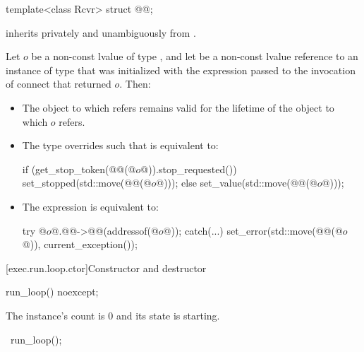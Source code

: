 \begin{itemdecl}
template<class Rcvr>
  struct @@;
\end{itemdecl}

\pnum
{}
inherits privately and unambiguously from .

\pnum
Let $o$ be a non-const lvalue of type ,
and let  be a non-const lvalue reference to an instance of type 
that was initialized with the expression 
passed to the invocation of connect that returned $o$.
Then:
\begin{itemize}
\item
The object to which  refers
remains valid for the lifetime of the object to which $o$ refers.
\item
The type  overrides
such that  is equivalent to:
\begin{codeblock}
if (get_stop_token(@@(@$o$@)).stop_requested()) {
  set_stopped(std::move(@@(@$o$@)));
} else {
  set_value(std::move(@@(@$o$@)));
}
\end{codeblock}
\item
The expression  is equivalent to:
\begin{codeblock}
try {
  @$o$@.@@->@@(addressof(@$o$@));
} catch(...) {
  set_error(std::move(@@(@$o$@)), current_exception());
}
\end{codeblock}
\end{itemize}

[exec.run.loop.ctor]{Constructor and destructor}

%
\begin{itemdecl}
run_loop() noexcept;
\end{itemdecl}

\begin{itemdescr}
\pnum
\ensures
The  instance's count is 0 and
its state is starting.
\end{itemdescr}

%
\begin{itemdecl}
~run_loop();
\end{itemdecl}

